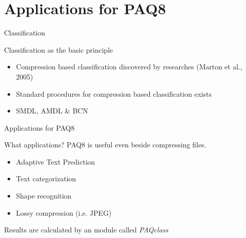 \documentclass[11pt,usenames,dvipsnames]{beamer}
\begin{document}
\section{Applications for PAQ8}
\begin{frame}{Classification}
	\begin{exampleblock}{Classification as the basic principle}
		\begin{itemize}
			\item Compression based classification discovered by researches (Marton et al., 2005)
			\item Standard procedures for compression based classification exists
			\item SMDL, AMDL \&  BCN 
		\end{itemize}
	\end{exampleblock}
	

\end{frame}

\begin{frame}{Applications for PAQ8}
	\begin{block}{What applications?}
	PAQ8 is useful even beside compressing files.
	\begin{itemize}
		\item Adaptive Text Prediction
		\item Text categorization
		\item Shape recognition
		\item Lossy compression (i.e. JPEG)
	\end{itemize}
	Results are calculated by an module called \textit{PAQclass}
	\end{block}

\end{frame}
\end{document}

